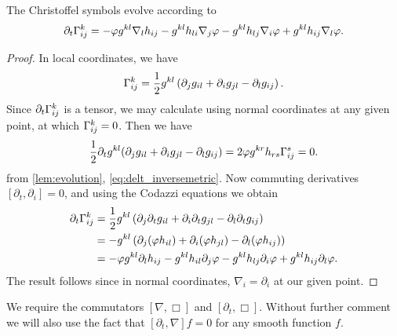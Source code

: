 \documentclass{amsart}
\begin{document}
\begin{lemma}
\label{EvGamma}
The Christoffel symbols evolve according to
\begin{equation}
\partial_t {\Gamma}^{k}_{ij} = -\varphi g^{kl} \nabla_l h_{ij} - g^{kl} h_{li} \nabla_j \varphi - g^{kl} h_{lj} \nabla_i \varphi + g^{kl} h_{ij} \nabla_l \varphi.
\end{equation}
\end{lemma}

\begin{proof}
In local coordinates, we have
\[
\Gamma^{k}_{ij} = \frac{1}{2} g^{kl} \left(\partial_j g_{il} + \partial_i g_{jl} - \partial_l g_{ij}\right).
\]
Since $\partial_t \Gamma^{k}_{ij}$ is a tensor, we may calculate using normal coordinates at any given point, at which \(\Gamma^k_{ij} = 0\). Then we have
\[
\frac{1}{2} \partial_t g^{kl} (\partial_j g_{il} + \partial_i g_{jl} - \partial_l g_{ij}) = 2\varphi g^{kr} h_{rs} \Gamma^s_{ij} = 0.
\]
from \cref{lem:evolution}, \cref{eq:delt_inversemetric}. Now commuting derivatives \([\partial_t, \partial_i] = 0\), and using the Codazzi equations we obtain
\[
\begin{split}
\partial_t {\Gamma}^{k}_{ij} & = \frac{1}{2} g^{kl} \left(\partial_j \partial_t g_{il} + \partial_i \partial_t g_{jl} - \partial_l \partial_t g_{ij}\right) \\
&= - g^{kl} \left(\partial_j (\varphi h_{il}) + \partial_i (\varphi h_{jl}) - \partial_l (\varphi h_{ij})\right) \\
&= -\varphi g^{kl} \partial_l h_{ij} - g^{kl} h_{il} \partial_j \varphi  - g^{kl} h_{lj} \partial_i \varphi + g^{kl} h_{ij} \partial_l \varphi.
\end{split}
\]
The result follows since in normal coordinates, \(\nabla_i = \partial_i\) at our given point. 
\end{proof}

We require the commutators \([\nabla, \Box]\) and \([\partial_t, \Box]\). Without further comment we will also use the fact that \([\partial_t, \nabla] f = 0\) for any smooth function \(f\).
\end{document}
